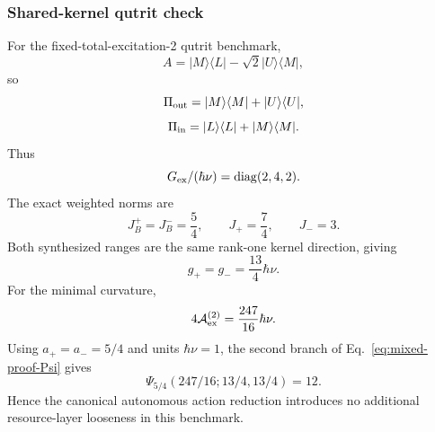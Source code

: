 \subsubsection{Shared-kernel qutrit check}

For the fixed-total-excitation-2 qutrit benchmark,
\begin{equation}
A=|M\rangle\langle L|-\sqrt2|U\rangle\langle M|,
\end{equation}
so
\begin{equation}
\Pi_{\rm out}=|M\rangle\langle M|+|U\rangle\langle U|,
\end{equation}
\begin{equation}
\Pi_{\rm in}=|L\rangle\langle L|+|M\rangle\langle M|.
\end{equation}
Thus
\begin{equation}
G_{\rm ex}/(\hbar\nu)=\operatorname{diag}(2,4,2).
\end{equation}
The exact weighted norms are
\begin{equation}
J_B^+=J_B^-=\frac54,
\qquad
J_+=\frac74,
\qquad
J_-=3.
\end{equation}
Both synthesized ranges are the same rank-one kernel direction, giving
\begin{equation}
g_+=g_-=\frac{13}{4}\hbar\nu.
\end{equation}
For the minimal curvature,
\begin{equation}
4\mathcal A_{\rm ex}^{(2)}=\frac{247}{16}\hbar\nu.
\end{equation}
Using $a_+=a_-=5/4$ and units $\hbar\nu=1$, the second branch of Eq.~\eqref{eq:mixed-proof-Psi} gives
\begin{equation}
\Psi_{5/4}(247/16;13/4,13/4)=12.
\end{equation}
Hence the canonical autonomous action reduction introduces no additional resource-layer looseness in this benchmark.
